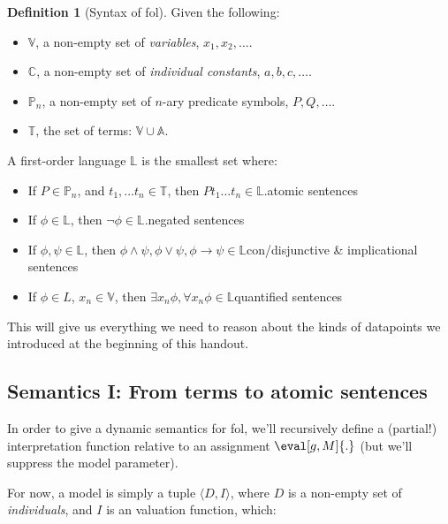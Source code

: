 \documentclass[nols,twoside,nofonts,nobib,nohyper]{tufte-handout}
\providecommand{\tightlist}{%
  \setlength{\itemsep}{0pt}\setlength{\parskip}{0pt}}
\theoremstyle{definition}
\newtheorem{definition}{Definition}[section]
\begin{document}
\begin{fullwidth}
\begin{definition}[Syntax of \ac{fol}] Given the following:

  \tightlist
  \begin{itemize}
          \tightlist
          \item $\mathbb{V}$, a non-empty set of \textit{variables}, $x_{1},x_{2},…$.
          \item $\mathbb{C}$, a non-empty set of \textit{individual constants}, $a,b,c,…$.
          \item $\mathbb{P}_{n}$, a non-empty set of $n$-ary predicate symbols, $P,Q,…$.
          \item $\mathbb{T}$, the set of terms: $\mathbb{V} ∪ \mathbb{A}$.
  \end{itemize}

  A first-order language $\mathbb{L}$ is the smallest set where:

  \begin{itemize}
          \tightlist
          \item If $P ∈ \mathbb{P}_{n}$, and $t_1,…t_{n} ∈ \mathbb{T}$, then $P t_{1} … t_{n} ∈ \mathbb{L}$.\hfill atomic sentences
          \item If $ϕ ∈ \mathbb{L}$, then $¬ ϕ ∈ \mathbb{L}$.\hfill negated sentences
          \item If $ϕ,ψ ∈ \mathbb{L}$, then $ϕ ∧ ψ, ϕ ∨ ψ, ϕ → ψ ∈ \mathbb{L}$\hfill con/disjunctive \& implicational sentences
          \item If $ϕ ∈ L$, $x_{n} ∈ \mathbb{V}$, then $∃x_{n} ϕ, ∀x_{n} ϕ ∈ \mathbb{L}$\hfill quantified sentences
  \end{itemize}
\end{definition}
\end{fullwidth}

This will give us everything we need to reason about the kinds of datapoints we introduced at the beginning of this handout.

\subsection{Semantics I: From terms to atomic sentences}

In order to give a dynamic semantics for \ac{fol}, we'll recursively define a (partial!) interpretation function relative to an assignment $\eval[g,M]{.}$ (but we'll suppress the model parameter).

For now, a model is simply a tuple $⟨D,I⟩$, where $D$ is a non-empty set of \textit{individuals}, and $I$ is an valuation function, which:
\end{document}
